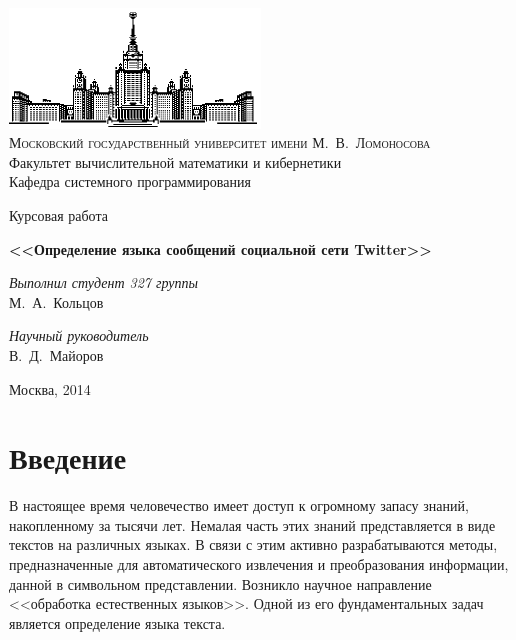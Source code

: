 \documentclass[a4paper, 14pt]{article}
\begin{document}
\linespread{1.3} %
\renewcommand{\rmdefault}{ftm} %
\frenchspacing
\thispagestyle{empty}


\begin{center}
\ \vspace{-3cm}

\includegraphics[width=0.5\textwidth]{msu.eps}\\

{\scshape Московский государственный университет имени М.~В.~Ломоносова}\\
Факультет вычислительной математики и кибернетики\\
Кафедра системного программирования

\vfill

{\LARGE Курсовая работа}

\vspace{1cm}

{\Huge\bfseries <<Определение языка сообщений социальной сети Twitter>>} \\

\end{center}

\vspace{1cm}

\begin{flushright}
  \large
  \textit{Выполнил студент 327 группы}\\
  М.~А.~Кольцов

  \vspace{5mm}

  \textit{Научный руководитель}\\
  В.~Д.~Майоров
\end{flushright}

\vfill

\begin{center}
Москва, 2014
\end{center}

\pagebreak
\tableofcontents
\pagebreak

\newtheorem{definition} {Определение}
\newtheorem{option} {Свойство}
\newtheorem{theorem} {Теорема}


\section{Введение}
	        В настоящее время человечество имеет доступ к огромному запасу знаний, накопленному за тысячи лет. Немалая часть этих знаний представляется
	        в виде текстов на различных языках. В связи с этим активно разрабатываются методы, предназначенные для автоматического извлечения
	        и преобразования информации, данной в символьном представлении. 
	        Возникло научное направление <<обработка естественных языков>>. Одной из его фундаментальных задач является определение языка текста. 
\end{document}
